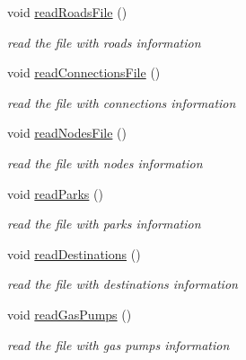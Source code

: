 \begin{DoxyCompactItemize}
\hypertarget{class_parking_a31cb6986a86de3ea2a740234cb8e981f}{}\label{class_parking_a31cb6986a86de3ea2a740234cb8e981f} 
void \hyperlink{class_parking_a31cb6986a86de3ea2a740234cb8e981f}{read\+Roads\+File} ()
\begin{DoxyCompactList}\small\item\em read the file with roads information \end{DoxyCompactList}\item 
\hypertarget{class_parking_a652748ece86c2e0350f962b122b175e7}{}\label{class_parking_a652748ece86c2e0350f962b122b175e7} 
void \hyperlink{class_parking_a652748ece86c2e0350f962b122b175e7}{read\+Connections\+File} ()
\begin{DoxyCompactList}\small\item\em read the file with connections information \end{DoxyCompactList}\item 
\hypertarget{class_parking_ad96e1f7a78c0c21d49c64c5c667c9d44}{}\label{class_parking_ad96e1f7a78c0c21d49c64c5c667c9d44} 
void \hyperlink{class_parking_ad96e1f7a78c0c21d49c64c5c667c9d44}{read\+Nodes\+File} ()
\begin{DoxyCompactList}\small\item\em read the file with nodes information \end{DoxyCompactList}\item 
\hypertarget{class_parking_a6349589812d75d4a10ee1e6442bdefd7}{}\label{class_parking_a6349589812d75d4a10ee1e6442bdefd7} 
void \hyperlink{class_parking_a6349589812d75d4a10ee1e6442bdefd7}{read\+Parks} ()
\begin{DoxyCompactList}\small\item\em read the file with parks information \end{DoxyCompactList}\item 
\hypertarget{class_parking_a3ec3ee75c3a2628798e952cba73bff57}{}\label{class_parking_a3ec3ee75c3a2628798e952cba73bff57} 
void \hyperlink{class_parking_a3ec3ee75c3a2628798e952cba73bff57}{read\+Destinations} ()
\begin{DoxyCompactList}\small\item\em read the file with destinations information \end{DoxyCompactList}\item 
\hypertarget{class_parking_a409bca3edb1a74d4992212bd642e92ed}{}\label{class_parking_a409bca3edb1a74d4992212bd642e92ed} 
void \hyperlink{class_parking_a409bca3edb1a74d4992212bd642e92ed}{read\+Gas\+Pumps} ()
\begin{DoxyCompactList}\small\item\em read the file with gas pumps information \end{DoxyCompactList}\item 

\end{DoxyCompactItemize}
